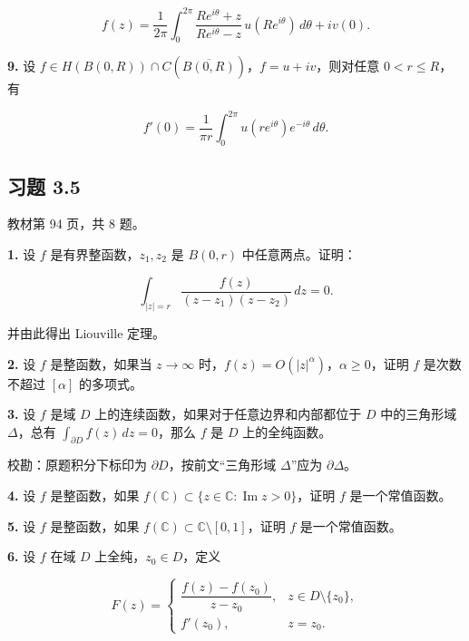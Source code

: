 \documentclass[11pt,a4paper]{article}
\begin{document}
\[
f(z)=\frac1{2\pi}\int_0^{2\pi}\frac{Re^{i\theta}+z}{Re^{i\theta}-z}\,u(Re^{i\theta})\,d\theta+iv(0).
\]

\par{}
\noindent\textbf{9.} 设
\(f\in H(B(0,R))\cap C(\overline{B(0,R)})\)，\(f=u+iv\)，则对任意
\(0<r\le R\)，有

\[
f'(0)=\frac1{\pi r}\int_0^{2\pi}u(re^{i\theta})e^{-i\theta}\,d\theta.
\]

\subsection{习题 3.5}\label{ch03-practice-ux4e60ux9898-35}

教材第 94 页，共 8 题。

\par{}
\noindent\textbf{1.} 设 \(f\) 是有界整函数，\(z_1,z_2\) 是 \(B(0,r)\)
中任意两点。证明：

\[
\int_{|z|=r}\frac{f(z)}{(z-z_1)(z-z_2)}\,dz=0.
\]

并由此得出 Liouville 定理。

\par{}
\noindent\textbf{2.} 设 \(f\) 是整函数，如果当 \(z\to\infty\)
时，\(f(z)=O(|z|^\alpha)\)，\(\alpha\ge0\)，证明 \(f\) 是次数不超过
\([\alpha]\) 的多项式。

\par{}
\noindent\textbf{3.} 设 \(f\) 是域 \(D\)
上的连续函数，如果对于任意边界和内部都位于 \(D\) 中的三角形域
\(\Delta\)，总有 \(\int_{\partial D}f(z)\,dz=0\)，那么 \(f\) 是 \(D\)
上的全纯函数。

校勘：原题积分下标印为 \(\partial D\)，按前文``三角形域 \(\Delta\)''应为
\(\partial\Delta\)。

\par{}
\noindent\textbf{4.} 设 \(f\) 是整函数，如果
\(f(\mathbb C)\subset\{z\in\mathbb C:\operatorname{Im}z>0\}\)，证明
\(f\) 是一个常值函数。

\par{}
\noindent\textbf{5.} 设 \(f\) 是整函数，如果
\(f(\mathbb C)\subset\mathbb C\setminus[0,1]\)，证明 \(f\)
是一个常值函数。

\par{}
\noindent\textbf{6.} 设 \(f\) 在域 \(D\) 上全纯，\(z_0\in D\)，定义

\[
F(z)=\begin{cases}\dfrac{f(z)-f(z_0)}{z-z_0},&z\in D\setminus\{z_0\},\\[5pt]f'(z_0),&z=z_0.\end{cases}
\]
\end{document}
